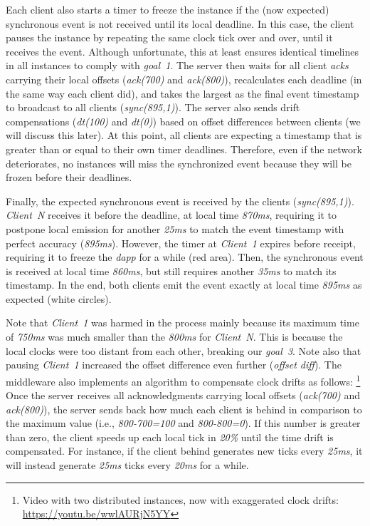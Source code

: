 \documentclass[sigplan,screen]{acmart}
\newcommand{\dapp}{\emph{dapp}\xspace}
\begin{document}
Each client also starts a timer to freeze the instance if the (now expected)
synchronous event is not received until its local deadline.
In this case, the client pauses the instance by repeating the same clock tick
over and over, until it receives the event.
Although unfortunate, this at least ensures identical timelines in all
instances to comply with \emph{goal~1}.
%
The server then waits for all client \emph{acks} carrying their local offsets
(\emph{ack(700)} and \emph{ack(800)}), recalculates each deadline (in the same
way each client did), and takes the largest as the final event timestamp to
broadcast to all clients (\emph{sync(895,1)}).
The server also sends drift compensations (\emph{dt(100)} and \emph{dt(0)})
based on offset differences between clients (we will discuss this later).
At this point, all clients are expecting a timestamp that is greater than or
equal to their own timer deadlines.
Therefore, even if the network deteriorates, no instances will miss the
synchronized event because they will be frozen before their deadlines.

Finally, the expected synchronous event is received by the clients
(\emph{sync(895,1)}).
\emph{Client~N} receives it before the deadline, at local time \emph{870ms},
requiring it to postpone local emission for another \emph{25ms} to match the
event timestamp with perfect accuracy (\emph{895ms}).
However, the timer at \emph{Client~1} expires before receipt, requiring it to
freeze the \dapp for a while (red area).
Then, the synchronous event is received at local time \emph{860ms}, but still
requires another \emph{35ms} to match its timestamp.
In the end, both clients emit the event exactly at local time \emph{895ms} as
expected (white circles).

Note that \emph{Client~1} was harmed in the process mainly because its maximum
time of \emph{750ms} was much smaller than the \emph{800ms} for \emph{Client~N}.
This is because the local clocks were too distant from each other, breaking our
\emph{goal~3}.
Note also that pausing \emph{Client~1} increased the offset difference even
further (\emph{offset diff}).
%
The middleware also implements an algorithm to compensate clock drifts as
follows:%
\footnote {
    Video with two distributed instances, now with exaggerated clock drifts:
    \url{https://youtu.be/wwlAURjN5YY}
}
Once the server receives all acknowledgments carrying local offsets
(\emph{ack(700)} and \emph{ack(800)}), the server sends back how much each
client is behind in comparison to the maximum value (i.e., \emph{800-700=100}
and \emph{800-800=0}).
If this number is greater than zero, the client speeds up each local tick in
\emph{20\%} until the time drift is compensated.
For instance, if the client behind generates new ticks every \emph{25ms}, it
will instead generate \emph{25ms} ticks every \emph{20ms} for a while.
\end{document}
